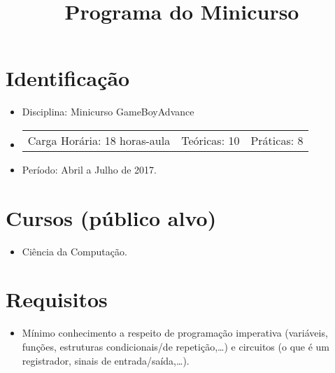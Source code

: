 \documentclass{article}
\title{Programa do Minicurso}
\author{}
\date{}
\begin{document}
\maketitle

\section{Identificação}

\begin{itemize}
    \item[] Disciplina: Minicurso GameBoyAdvance
    \item[]
        \hspace{-1em}
        \begin{tabular}{ccc}
            Carga Horária: 18 horas-aula&
            Teóricas: 10&
            Práticas: 8
        \end{tabular}
    \item[] Período: Abril a Julho de 2017.
\end{itemize}

\section{Cursos (público alvo)}
\begin{itemize}
    \item[] Ciência da Computação.
\end{itemize}

\section{Requisitos}
\begin{itemize}
    \item[] Mínimo conhecimento a respeito de programação imperativa
        (variáveis, funções, estruturas condicionais/de repetição,\ldots) e
        circuitos (o que é um registrador, sinais de entrada/saída,\ldots).
\end{itemize}
\end{document}

